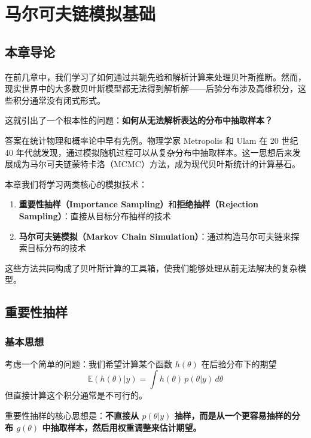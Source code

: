 
\chapter{马尔可夫链模拟基础}

\section{本章导论}

在前几章中，我们学习了如何通过共轭先验和解析计算来处理贝叶斯推断。然而，现实世界中的大多数贝叶斯模型都无法得到解析解——后验分布涉及高维积分，这些积分通常没有闭式形式。

这就引出了一个根本性的问题：\textbf{如何从无法解析表达的分布中抽取样本？}

答案在统计物理和概率论中早有先例。物理学家 Metropolis 和 Ulam 在 20 世纪 40 年代就发现，通过模拟随机过程可以从复杂分布中抽取样本。这一思想后来发展成为马尔可夫链蒙特卡洛（MCMC）方法，成为现代贝叶斯统计的计算基石。

本章我们将学习两类核心的模拟技术：
\begin{enumerate}
  \item \textbf{重要性抽样（Importance Sampling）}和\textbf{拒绝抽样（Rejection Sampling）}：直接从目标分布抽样的技术
  \item \textbf{马尔可夫链模拟（Markov Chain Simulation）}：通过构造马尔可夫链来探索目标分布的技术
\end{enumerate}

这些方法共同构成了贝叶斯计算的工具箱，使我们能够处理从前无法解决的复杂模型。

\section{重要性抽样}

\subsection{基本思想}

考虑一个简单的问题：我们希望计算某个函数 $h(\theta)$ 在后验分布下的期望
\begin{equation}\label{eq:posterior-expectation}
\mathbb{E}(h(\theta) | y) = \int h(\theta) \, p(\theta | y) \, d\theta
\end{equation}
但直接计算这个积分通常是不可行的。

重要性抽样的核心思想是：\textbf{不直接从 $p(\theta | y)$ 抽样，而是从一个更容易抽样的分布 $g(\theta)$ 中抽取样本，然后用权重调整来估计期望。}

